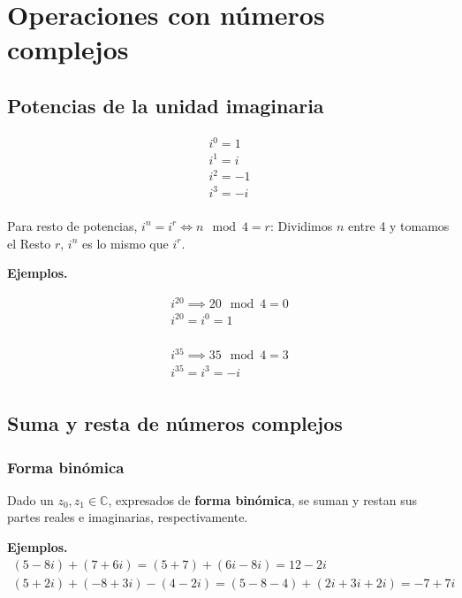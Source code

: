 \documentclass[12pt]{article}
\begin{document}
\section{Operaciones con números complejos}

\subsection{Potencias de la unidad imaginaria}

\begin{align*}
    i^0 = 1  \\
    i^1 = i  \\
    i^2 = -1 \\
    i^3 = -i \\
\end{align*}

Para resto de potencias, \(i^n = i^r \iff n \mod 4 = r\):
Dividimos \(n\) entre 4 y tomamos el Resto \(r\),
\(i^n\) es lo mismo que \(i^r\).

\textbf{Ejemplos.}

\begin{align*}
    i^{20} \implies 20 \mod 4 = 0 \\
    \boxed{i^{20} = i^0 = 1}      \\
\end{align*}

\begin{align*}
    i^{35} \implies 35 \mod 4 = 3 \\
    \boxed{i^{35} = i^3 = -i}     \\
\end{align*}

\subsection{Suma y resta de números complejos}

\subsubsection{Forma binómica}

Dado un \(z_0,z_1 \in \mathbb{C}\),
expresados de \textbf{forma binómica},
se suman y restan sus partes reales e imaginarias,
respectivamente.

\textbf{Ejemplos.}
\begin{align*}
    (5 - 8i) + (7 + 6i) = (5 + 7) + (6i - 8i) = 12 - 2i                    \\
    (5 + 2i) + (-8 + 3i) - (4-2i) = (5 - 8 - 4) + (2i + 3i + 2i) = -7 + 7i \\
\end{align*}
\end{document}
